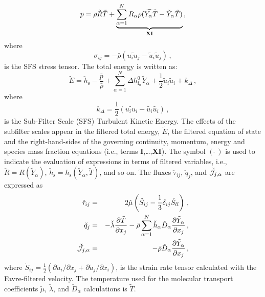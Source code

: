 \documentclass[titlepage,11pt,letterpaper]{article}
\begin{document}
\begin{equation} 
  \label{eq:filt_eq_state} 
  \bar{p} = \bar{\rho} \check{R} \tilde{T} 
  + \underbrace{ \sum_{\alpha=1}^N R_\alpha \bar{\rho}
    (\widetilde{Y_\alpha T} - \tilde{Y}_\alpha \tilde{T}) }_{\bf XI} \,,
\end{equation}
%
%
where
%
\begin{equation}
  \label{eq:sfs_stresses}
  \sigma_{ij} = - \bar{\rho} \left( \widetilde{u_i u_j} - \tilde{u}_i \tilde{u}_j \right) \,, 
\end{equation}
%                     
is the SFS stress tensor. The total energy is written as:
%
\begin{equation}
  \tilde{E} = \check{h}_{\mathrm{s}} - \frac{\bar{p}}{\bar{\rho}} 
  + \sum_{\alpha=1}^N \Delta h^0_{\mathrm{f}_\alpha} \tilde{Y}_\alpha 
  + \frac{1}{2}\tilde{u}_i \tilde{u}_i + k_\Delta \,,
\end{equation}
%
where
% 
\begin{equation}
  k_\Delta = \frac{1}{2} \left( \widetilde{u_i u_i} - \tilde{u_i}\tilde{u_i} \right) \,,
\end{equation}
%
is the Sub-Filter Scale (SFS) Turbulent Kinetic Energy. The effects of the subfilter scales appear in the filtered total energy, $\tilde{E}$, the filtered
equation of state and the right-hand-sides of the governing continuity, momentum, energy and species mass fraction equations (i.e., terms \textbf{I},\ldots,\textbf{XI}). The symbol $(\,\check{}\,)$ is used to indicate the evaluation of expressions in terms of filtered variables, i.e.,
$\check{R}\!=\!R(\tilde{Y}_\alpha)$,
$\check{h}_{\mathrm{s}}\!=\!h_{\mathrm{s}}(\tilde{Y}_\alpha,\tilde{T})$,
and so on. The fluxes $\check{\tau}_{ij}$, $\check{q}_j$, and
$\check{\cal J}_{j,\alpha}$ are expressed as
%
\begin{eqnarray}
  \check{\tau}_{ij} & = &  2 \check{\mu} \left( \check{S}_{ij} - 
  \frac{1}{3} \delta_{ij}\check{S}_{ll} \right) \,,  \\
%
  \check{q}_j & = &  - \check{\lambda} \frac{\partial \tilde{T}}{\partial x_j} 
  - \bar{\rho} \sum_{\alpha=1}^N \check{h}_\alpha \check{D}_\alpha \frac{\partial \tilde{Y}_\alpha}{\partial x_j} \,, \\
%
  \check{\cal J}_{j,\alpha} & = &  - \bar{\rho} \check{D}_\alpha \frac{\partial \tilde{Y}_\alpha}{\partial x_j} \,,
\end{eqnarray}
%
where 
%
$\check{S}_{ij} \!=\! \frac{1}{2} \left(\partial \tilde{u}_{i}/\partial
  x_{j} + \partial \tilde{u}_j/ \partial x_i \right)$, is the strain
rate tensor calculated with the Favre-filtered velocity.  The temperature used for the molecular transport coefficients $\check{\mu}$, $\check{\lambda}$, and
$\check{D}_\alpha$ calculations is $\tilde{T}$.
\end{document}
